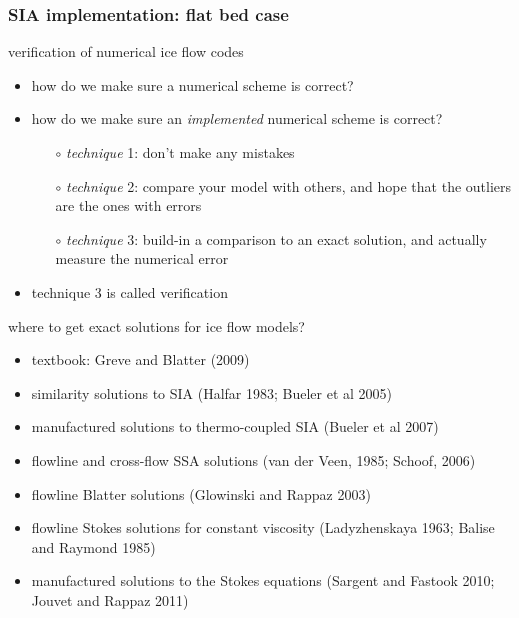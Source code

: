 \begin{frame}
  \frametitle{SIA implementation: flat bed case}


\end{frame}


\begin{frame}{verification of numerical ice flow codes}
\begin{itemize}
\item how do we make sure a numerical scheme is correct?

\vspace{5mm}
\item how do we make sure an \emph{implemented} numerical scheme is correct?
  \begin{itemize}
  \item[$\circ$] \emph{technique} 1: don't make any mistakes
  \item[$\circ$] \emph{technique} 2: compare your model with others, and hope that the outliers are the ones with errors
  \item[$\circ$] \emph{technique} 3: build-in a comparison to an exact solution, and actually measure the numerical error
  \end{itemize}

\vspace{5mm}
\item technique 3 is called \alert{verification}
\end{itemize}
\end{frame}


\begin{frame}{where to get exact solutions for ice flow models?}

\small
\begin{itemize}
  \item textbook: Greve and Blatter (2009)
  \item similarity solutions to SIA (Halfar 1983; Bueler et al 2005)
  \item manufactured solutions to thermo-coupled SIA (Bueler et al 2007)
  \item flowline and cross-flow SSA solutions (van der Veen, 1985; Schoof, 2006)
  \item flowline Blatter solutions (Glowinski and Rappaz 2003)
  \item flowline Stokes solutions for constant viscosity (Ladyzhenskaya 1963; Balise and Raymond 1985)
  \item manufactured solutions to the Stokes equations (Sargent and Fastook 2010; Jouvet and Rappaz 2011)
\end{itemize}
\end{frame}


